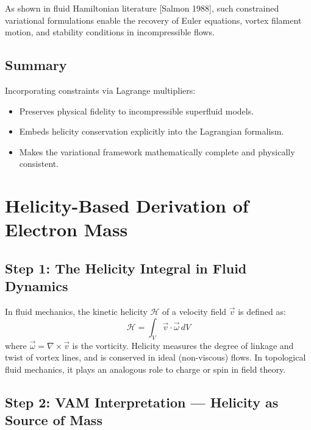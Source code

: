 \documentclass[12pt]{article}
\begin{document}
As shown in fluid Hamiltonian literature [Salmon 1988], such constrained variational formulations enable the recovery of Euler equations, vortex filament motion, and stability conditions in incompressible flows.

\subsection*{Summary}

Incorporating constraints via Lagrange multipliers:
\begin{itemize}
    \item Preserves physical fidelity to incompressible superfluid models.
    \item Embeds helicity conservation explicitly into the Lagrangian formalism.
    \item Makes the variational framework mathematically complete and physically consistent.
\end{itemize}

\section{Helicity-Based Derivation of Electron Mass}

\subsection*{Step 1: The Helicity Integral in Fluid Dynamics}

In fluid mechanics, the kinetic helicity \( \mathcal{H} \) of a velocity field \( \vec{v} \) is defined as:
\[
\boxed{
\mathcal{H} = \int_V \vec{v} \cdot \vec{\omega} \, dV
}
\tag{1}
\]
where \( \vec{\omega} = \nabla \times \vec{v} \) is the vorticity. Helicity measures the degree of linkage and twist of vortex lines, and is conserved in ideal (non-viscous) flows. In topological fluid mechanics, it plays an analogous role to charge or spin in field theory.

\subsection*{Step 2: VAM Interpretation — Helicity as Source of Mass}
\end{document}
